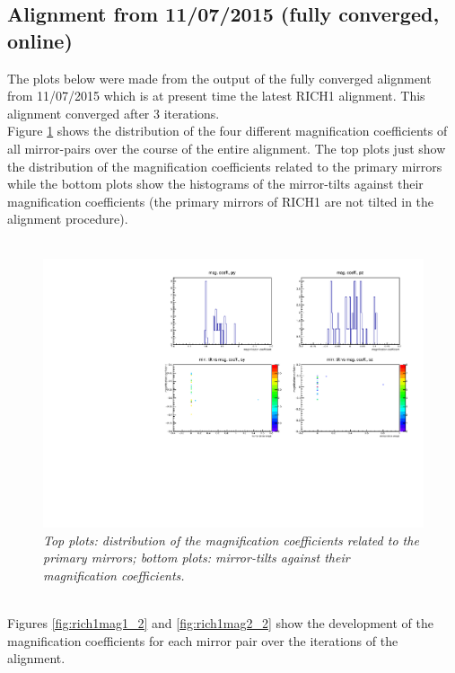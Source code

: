 \subsection{Alignment from 11/07/2015 (fully converged, online)}
The plots below were made from the output of the fully converged alignment from 11/07/2015 which is at present time the latest RICH1 alignment. This alignment converged after 3 iterations.\\
Figure \ref{fig:rich12d_2} shows the distribution of the four different magnification coefficients of all mirror-pairs over the course of the entire alignment. The top plots just show the distribution of the magnification coefficients related to the primary mirrors while the bottom plots show the histograms of the mirror-tilts against their magnification coefficients (the primary mirrors of RICH1 are not tilted in the alignment procedure).\\
\\ 
\begin{figure}[!ht]
	\vspace*{-0.cm}
	\begin{center}
		\includegraphics[width=1.\textwidth]{2dplot_rich1_2.pdf}
		\vspace*{-1.5cm}
	\end{center}
	\caption{\textit{Top plots: distribution of the magnification coefficients related to the primary mirrors; bottom plots: mirror-tilts against their magnification coefficients.}}
	\label{fig:rich12d_2}
\end{figure}
\\
Figures \ref{fig:rich1mag1_2} and \ref{fig:rich1mag2_2} show the development of the magnification coefficients for each mirror pair over the iterations of the alignment.\\
